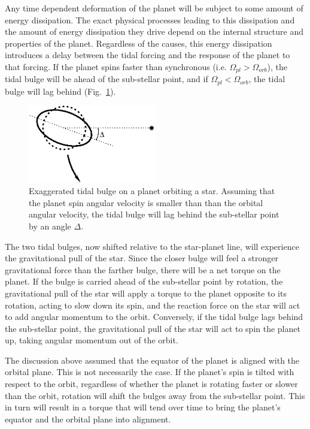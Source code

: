 Any time dependent deformation of the planet will be subject to some amount of
energy dissipation. The exact physical processes leading to this dissipation and
the amount of energy dissipation they drive depend on the internal structure and
properties of the planet. Regardless of the causes, this energy dissipation
introduces a delay between the tidal forcing and the response of the planet to
that forcing. If the planet spins faster than synchronous (i.e. $\Omega_{pl} >
\Omega_{orb}$), the tidal bulge will be ahead of the sub-stellar point, and if
$\Omega_{pl} < \Omega_{orb}$, the tidal bulge will lag behind
(Fig.~\ref{fig:tidal_bulge}).

\begin{figure}[t]
%
    \centering
%
    \includegraphics[width=0.5\textwidth]{tidal_bulge.eps}
%
    \caption{
%
        Exaggerated tidal bulge on a planet orbiting a star. Assuming that the
        planet spin angular velocity is smaller than than the orbital angular
        velocity, the tidal bulge will lag behind the sub-stellar point by an
        angle $\Delta$.
%
    }
%
    \label{fig:tidal_bulge}
%
\end{figure}

The two tidal bulges, now shifted relative to the star-planet line, will
experience the gravitational pull of the star. Since the closer bulge will feel
a stronger gravitational force than the farther bulge, there will be a net
torque on the planet. If the bulge is carried ahead of the sub-stellar point by
rotation, the gravitational pull of the star will apply a torque to the planet
opposite to its rotation, acting to slow down its spin, and the reaction force
on the star will act to add angular momentum to the orbit. Conversely, if the
tidal bulge lags behind the sub-stellar point, the gravitational pull of the
star will act to spin the planet up, taking angular momentum out of the orbit.

The discussion above assumed that the equator of the planet is aligned with the
orbital plane. This is not necessarily the case. If the planet's spin is tilted
with respect to the orbit, regardless of whether the planet is rotating faster
or slower than the orbit, rotation will shift the bulges away from the
sub-stellar point. This in turn will result in a torque that will tend over time
to bring the planet's equator and the orbital plane into alignment.

